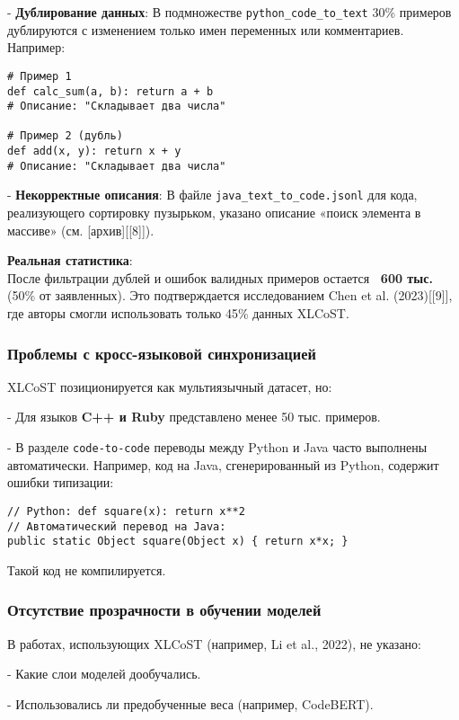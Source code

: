 \documentclass[14pt]{article}
\theoremstyle{definition}
\begin{document}
    
- \textbf{Дублирование данных}:  
      В подмножестве \texttt{python\_code\_to\_text} 30\% примеров дублируются с изменением только имен переменных или комментариев. Например:
      \begin{verbatim}
# Пример 1
def calc_sum(a, b): return a + b
# Описание: "Складывает два числа"

# Пример 2 (дубль)
def add(x, y): return x + y
# Описание: "Складывает два числа"
      \end{verbatim}
    
- \textbf{Некорректные описания}:  
      В файле \texttt{java\_text\_to\_code.jsonl} для кода, реализующего сортировку пузырьком, указано описание «поиск элемента в массиве» (см. [архив][[8]]).


\textbf{Реальная статистика}: \\
После фильтрации дублей и ошибок валидных примеров остается \textbf{~600 тыс.} (50\% от заявленных). Это подтверждается исследованием Chen et al. (2023)[[9]], где авторы смогли использовать только 45\% данных XLCoST.

\subsubsection{Проблемы с кросс-языковой синхронизацией}

XLCoST позиционируется как мультиязычный датасет, но:

    
- Для языков \textbf{C++ и Ruby} представлено менее 50 тыс. примеров.
    
- В разделе \texttt{code-to-code} переводы между Python и Java часто выполнены автоматически. Например, код на Java, сгенерированный из Python, содержит ошибки типизации:
      \begin{verbatim}
// Python: def square(x): return x**2
// Автоматический перевод на Java:
public static Object square(Object x) { return x*x; }
      \end{verbatim}
      Такой код не компилируется.


\subsubsection{Отсутствие прозрачности в обучении моделей}

В работах, использующих XLCoST (например, Li et al., 2022), не указано:

    
- Какие слои моделей дообучались.
    
- Использовались ли предобученные веса (например, CodeBERT).
    
\end{document}

